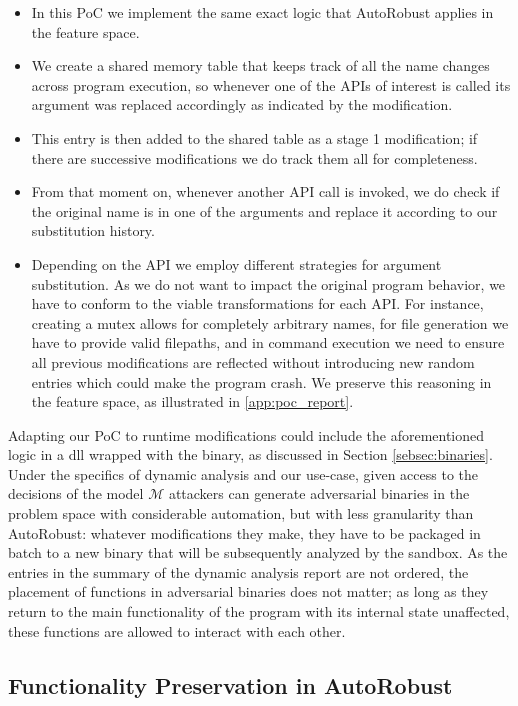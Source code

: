 \begin{itemize}[leftmargin=*]
    \item In this PoC we implement the same exact logic that AutoRobust applies in the feature space.
    \item We create a shared memory table that keeps track of all the name changes across program execution, so whenever one of the APIs of interest is called its argument was replaced accordingly as indicated by the modification.
    \item This entry is then added to the shared table as a stage 1 modification; if there are successive modifications we do track them all for completeness.
    \item From that moment on, whenever another API call is invoked, we do check if the original name is in one of the arguments and replace it according to our substitution history.
    \item Depending on the API we employ different strategies for argument substitution. As we do not want to impact the original program behavior, we have to conform to the viable transformations for each API. For instance, creating a mutex allows for completely arbitrary names, for file generation we have to provide valid filepaths, and in command execution we need to ensure all previous modifications are reflected without introducing new random entries which could make the program crash. We preserve this reasoning in the feature space, as illustrated in \autoref{app:poc_report}.
\end{itemize}

Adapting our PoC to runtime modifications could include the aforementioned logic in a dll wrapped with the binary, as discussed in Section \ref{sebsec:binaries}.
Under the specifics of dynamic analysis and our use-case, given access to the decisions of the model $\mathcal{M}$ attackers can generate adversarial binaries in the problem space with considerable automation, but with less granularity than AutoRobust: whatever modifications they make, they have to be packaged in batch to a new binary that will be subsequently analyzed by the sandbox.
As the entries in the summary of the dynamic analysis report are not ordered, the placement of functions in adversarial binaries does not matter; as long as they return to the main functionality of the program with its internal state unaffected, these functions are allowed to interact with each other.

\subsection{Functionality Preservation in AutoRobust}

